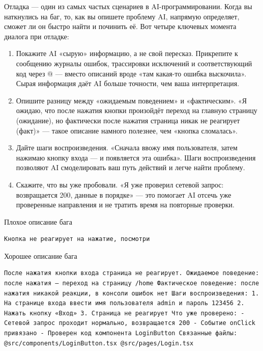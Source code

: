 
Отладка — один из самых частых сценариев в AI-программировании. Когда вы наткнулись на баг, то, как вы опишете проблему AI, напрямую определяет, сможет ли он быстро найти и починить её. Вот четыре ключевых момента диалога при отладке:

\begin{enumerate}
  \item Покажите AI «сырую» информацию, а не свой пересказ. Прикрепите к сообщению журналы ошибок, трассировки исключений и соответствующий код через @ — вместо описаний вроде «там какая-то ошибка выскочила». Сырая информация даёт AI больше точности, чем ваша интерпретация.
  \item Опишите разницу между «ожидаемым поведением» и «фактическим». «Я ожидаю, что после нажатия кнопки произойдёт переход на главную страницу (ожидание), но фактически после нажатия страница никак не реагирует (факт)» — такое описание намного полезнее, чем «кнопка сломалась».
  \item Дайте шаги воспроизведения. «Сначала ввожу имя пользователя, затем нажимаю кнопку входа — и появляется эта ошибка». Шаги воспроизведения позволяют AI смоделировать ваш путь действий и легче найти проблему.
  \item Скажите, что вы уже пробовали. «Я уже проверил сетевой запрос: возвращается 200, данные в порядке» — это помогает AI отсечь уже проверенные направления и не тратить время на повторные проверки.
\end{enumerate}

Плохое описание бага

\begin{lstlisting}
Кнопка не реагирует на нажатие, посмотри
\end{lstlisting}

Хорошее описание бага

\begin{lstlisting}
После нажатия кнопки входа страница не реагирует. Ожидаемое поведение: после нажатия — переход на страницу /home Фактическое поведение: после нажатия никакой реакции, в консоли ошибок нет Шаги воспроизведения: 1. На странице входа ввести имя пользователя admin и пароль 123456 2. Нажать кнопку «Вход» 3. Страница не реагирует Что уже проверено: - Сетевой запрос проходит нормально, возвращается 200 - Событие onClick привязано - Проверен код компонента LoginButton Связанные файлы: @src/components/LoginButton.tsx @src/pages/Login.tsx
\end{lstlisting}

